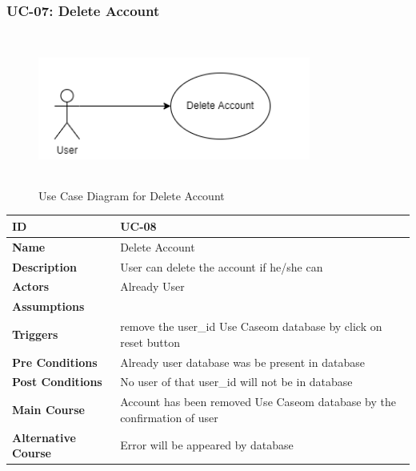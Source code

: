     \subsubsection{UC-07: Delete Account}
    \begin{figure}[H]
        \includegraphics[height=5cm, width=0.8\textwidth]{./diagrams/Use Case/u7.png}
        \centering 
        \caption{Use Case Diagram for Delete Account}
        \label{fig:Usecase1}
        \end{figure}
        
    \begin{center}
        \begin{tabularx}{\textwidth}{|l|X|}
            \hline
            \textbf{ID} & UC-08 \\
            \hline
            \textbf{Name} & Delete Account \\
            \hline
            \textbf{Description} & User can delete the account if he/she can \\
            \hline
            \textbf{Actors} & Already User \\
            \hline
            \textbf{Assumptions} &  \\
            \hline
            \textbf{Triggers} & remove the user\_id Use Caseom database by click on reset button \\
            \hline
            \textbf{Pre Conditions} & Already user database was be present in database \\
            \hline
            \textbf{Post Conditions} & No user of that user\_id will not be in database \\
            \hline
            \textbf{Main Course} & Account has been removed Use Caseom database by the confirmation of user \\
            \hline
            \textbf{Alternative Course} & Error will be appeared by database \\
            \hline
            
        \end{tabularx}
    \end{center}
    \newpage
    

